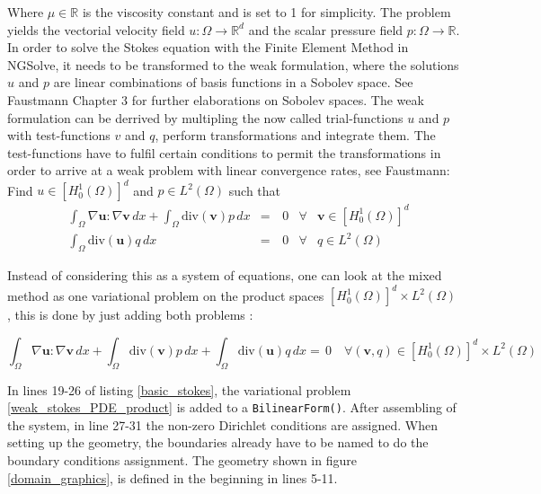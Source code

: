 \null

Where $\mu \in \mathbb{R}$ is the viscosity constant and is set to 1 for simplicity. 
The problem yields the vectorial velocity field $u:\Omega \rightarrow \mathbb{R}^d$ and 
the scalar pressure field $p:\Omega \rightarrow \mathbb{R}$. In order to solve the Stokes equation with the Finite Element Method in NGSolve,
it needs to be transformed to the weak formulation, where the solutions $u$ and $p$ are linear combinations of basis functions in a Sobolev space.
See Faustmann\cite{lecture_notes_faustmann_numPDE} Chapter 3 for further elaborations on Sobolev spaces. The weak formulation can be derrived by
multipling the now called trial-functions $u$ and $p$ with test-functions $v$ and $q$, perform transformations and integrate them. The test-functions have to fulfil certain
conditions to permit the transformations in order to arrive at a weak problem with 
linear convergence rates, see Faustmann\cite{lecture_notes_faustmann_numPDE}: \\

Find $u \in [H^1_0(\Omega)]^d$ and $p \in L^2(\Omega)$ such that
\begin{equation}\label{weak_stokes_PDE}
    \begin{aligned}
    &\int_{\Omega} \nabla \mathbf{u} : \nabla \mathbf{v} \, dx + \int_{\Omega} \mathrm{div}(\mathbf{v})p \, dx &=& \, 0 &\forall& \mathbf{v} \in [H^1_0(\Omega)]^d \\
    &\int_{\Omega} \mathrm{div}(\mathbf{u})q \, dx &=& \, 0   &\forall& q \in L^2(\Omega)
    \end{aligned}
\end{equation}

\null

Instead of considering this as a system of equations, one can look at the mixed method as one variational problem on
the product spaces $[H^1_0(\Omega)]^d \times L^2(\Omega)$, this is done by just adding both problems \cite{lecture_notes_faustmann_numPDE}:

\null

\begin{equation}\label{weak_stokes_PDE_product}
    \int_{\Omega} \nabla \mathbf{u} : \nabla \mathbf{v} \, dx + \int_{\Omega} \mathrm{div}(\mathbf{v})p \, 
    dx + \int_{\Omega} \mathrm{div}(\mathbf{u})q \, dx = \, 0 \quad \forall (\mathbf{v},q)
    \in  [H^1_0(\Omega)]^d \times L^2(\Omega)
\end{equation}

\null

In lines 19-26 of listing \ref{basic_stokes}, the variational problem \ref{weak_stokes_PDE_product} is added to
a \texttt{BilinearForm()}. After assembling of the system, in line 27-31 the non-zero Dirichlet conditions are assigned. 
When setting up the geometry, the boundaries already have to be named to do the boundary conditions assignment. The geometry
shown in figure \ref{domain_graphics}, is defined in the beginning in lines 5-11.


